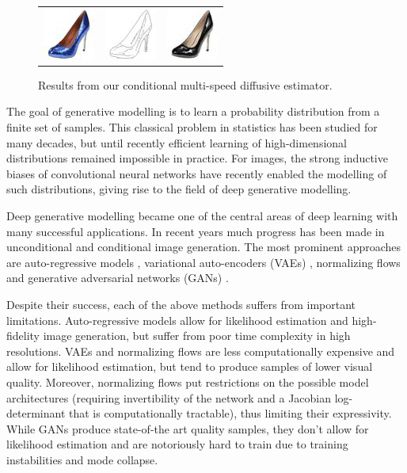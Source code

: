\begin{figure}[h]
\begin{center}
\begin{tabular}{ccc}
        \includegraphics[width=.13\textwidth]{Chapter2/samples/teaser/189_x.png} &   
        \includegraphics[width=.13\textwidth]{Chapter2/samples/teaser/189_y.png} &
        \includegraphics[width=.13\textwidth]{Chapter2/samples/teaser/189_3.png}  \\
    \end{tabular}
    \end{center}
    \caption{Results from our conditional multi-speed diffusive estimator.}
    \label{ch2:fig:_teaser}
\end{figure}

The goal of generative modelling is to learn a  probability distribution from a finite set of samples. This classical problem in statistics has been studied for many decades, but until recently efficient learning of high-dimensional distributions remained impossible in practice. For images, the strong inductive biases of convolutional neural networks have recently enabled the modelling of such distributions, giving rise to the field of deep generative modelling.

Deep generative modelling became one of the central areas of deep learning with many successful applications.
In recent years much progress has been made in unconditional and conditional image generation.
The most prominent approaches are auto-regressive models \cite{bengio2005autoregressive}, variational auto-encoders (VAEs) \cite{kingma2014autoencoding},  normalizing flows \cite{papamakarios2021normalizing} and generative adversarial networks (GANs) \cite{goodfellow2014generative}.

Despite their success, each of the above methods suffers from important limitations. Auto-regressive models allow for likelihood estimation and high-fidelity image generation, but suffer from poor time complexity in high resolutions. VAEs and normalizing flows are less computationally expensive and allow for likelihood estimation, but tend to produce samples of lower visual quality. Moreover, normalizing flows put restrictions on the possible model architectures (requiring invertibility of the network and a Jacobian log-determinant that is computationally tractable), thus limiting their expressivity. While GANs produce state-of-the art quality samples, they don't allow for likelihood estimation and are notoriously hard to train due to training instabilities and mode collapse. 

